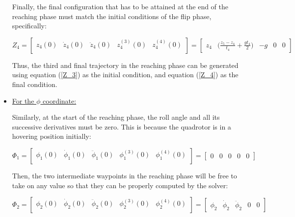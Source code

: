 \documentclass{thesisreport}
\begin{document}
\begin{itemize}
Finally, the final configuration that has to be attained at the end of the reaching phase must match the initial conditions of the flip phase, specifically:

\begin{equation}\label{Z_4}
	Z_4 = \begin{bmatrix}
	z_4(0) & \dot{z}_4 (0) & \ddot{z}_4 (0) & z_4^{(3)} (0) & z_4^{(4)} (0) \\
	\end{bmatrix} = \begin{bmatrix}
	z_4 & \bigg(\frac{z_5 - z_4}{t_4} + \frac{g t_4}{2} \bigg) & -g & 0 & 0
	\end{bmatrix} 
\end{equation}

Thus, the third and final trajectory in the reaching phase can be generated using equation (\ref{Z_3}) as the initial condition, and equation (\ref{Z_4}) as the final condition.

	\item \underline{For the $\phi$ coordinate:}

Similarly, at the start of the reaching phase, the roll angle and all its successive derivatives must be zero. This is because the quadrotor is in a hovering position initially:

\begin{equation}\label{Phi_1}
	\Phi_1 = \begin{bmatrix}
	\phi_1(0) & \dot{\phi}_1 (0) & \ddot{\phi}_1 (0) & \phi_1^{(3)} (0) & \phi_1^{(4)} (0) \\
	\end{bmatrix} = \begin{bmatrix}
	0 & 0 & 0 & 0 & 0
	\end{bmatrix} 
\end{equation}

Then, the two intermediate waypoints in the reaching phase will be free to take on any value so that they can be properly computed by the solver:


\begin{equation}\label{Phi_2}
	\Phi_2 = \begin{bmatrix}
	\phi_2(0) & \dot{\phi}_2 (0) & \ddot{\phi}_2 (0) & \phi_2^{(3)} (0) & \phi_2^{(4)} (0) \\
	\end{bmatrix} = \begin{bmatrix}
	\phi_2 & \dot{\phi}_2 & \ddot{\phi}_2 & 0 & 0
	\end{bmatrix} 
\end{equation}


\end{itemize}
\end{document}
